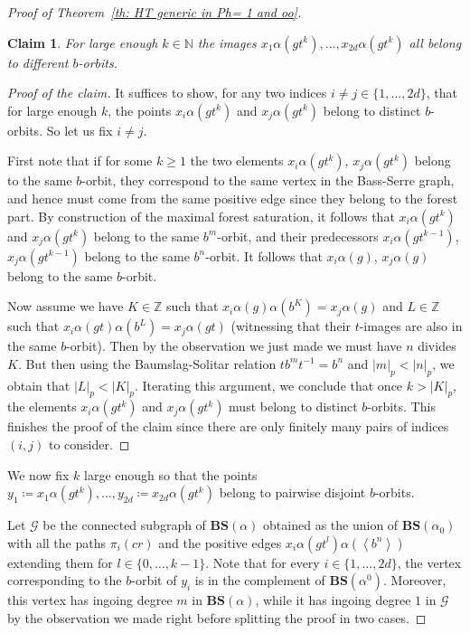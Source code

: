 \documentclass[12pt]{article}
\numberwithin{equation}{section}
\newtheorem{claim}[equation]{Claim}
\theoremstyle{definition}
\newenvironment{cproof}{\begin{proof}[Proof of the
        claim]\renewcommand*{\qedsymbol}{\(\square_\text{claim}\)}}{\end{proof}}
\newcommand{\N}{\mathbb{N}}
\newcommand{\Z}{\mathbb{Z}}
\newcommand{\inv}{^{-1}}
\newcommand{\la}{\left\langle}
\newcommand{\ra}{\right\rangle}
\newcommand{\abs}[1]{\left\lvert #1\right\rvert}
\newcommand\BSe{\mathbf{BS}}
\begin{document}
\begin{proof}[Proof of Theorem~\ref{th: HT generic in Ph= 1 and oo}]
	
	\begin{claim} 
	For large enough \(k\in\N\) the images 
	$x_1\alpha(gt^k),\dots,x_{2d}\alpha(gt^k)$ all belong to different \( b \)-orbits.
	\end{claim}
	\begin{cproof}
	It suffices to show, for any two indices \(i\neq j\in\{1,\dots,2d\}\),
	that for large enough 
	\(k\), the points \(x_i\alpha(gt^k)\) and \(x_j\alpha(gt^k)\) belong to distinct \(b\)-orbits.
	So let us fix $i\neq j$.
	


	
	
	First note that 
	if for some \(k\geq 1\) the two elements \(x_i\alpha(gt^k)\), \(x_j\alpha(gt^k)\) 
	belong to the same \(b\)-orbit, they correspond
	 to the same vertex in the Bass-Serre graph, 
	 and hence must come 
	 from the same positive edge since they belong to the
	 forest part. 
	 By construction of the maximal forest saturation,
	it follows that \(x_i\alpha(gt^k)\) and \(x_j\alpha(gt^k)\)   belong to the same \(b^m\)-orbit, and their predecessors
	\(x_i\alpha(gt^{k-1})\), \(x_j\alpha(gt^{k-1})\) belong to the same \(b^n\)-orbit.
	It follows that \(x_i\alpha(g)\), \(x_j\alpha(g)\) belong to the same \(b\)-orbit.
	

	Now assume we have $K\in\Z$ such that $x_i\alpha(g)\alpha(b^K)=x_j\alpha(g)$ 
	and \(L\in\Z\) such that $x_i\alpha(gt)\alpha(b^L)=x_j\alpha(gt)$ 
	(witnessing that their \( t \)-images are also in the same \( b \)-orbit).
	Then by the observation we just made we must have \(n\) divides \(K\).
	But then using the Baumslag-Solitar relation \(tb^mt\inv =b^n\) and \(\abs{m}_p<\abs{n}_p\), 
	we obtain that
    $\abs{L}_p<\abs{K}_p$. Iterating this argument, we conclude that once \(k>\abs{K}_p\), 
	the elements \(x_i\alpha(gt^k)\) and \(x_j\alpha(gt^k)\) must belong to distinct \(b\)-orbits. 
	This finishes the proof of the claim since there are only finitely many pairs of indices \((i,j)\) to consider.
	\end{cproof}
    
    
    We now fix \(k\) large enough so that the points
    $y_1 \coloneqq x_1\alpha(gt^k),\dots, y_{2d} \coloneqq x_{2d}\alpha(gt^k)$ belong to pairwise disjoint \( b \)-orbits. 
	

	Let \(\mathcal G\) be the connected subgraph of \(\BSe(\alpha)\)
	obtained as the union of \(\BSe(\alpha_0)\) with all the paths 
	\(\pi_i(cr)\)  and the positive edges \(x_i\alpha(gt^l)\alpha(\la b^n\ra)\) 
	extending them for 
	\(l\in\{0,\dots,k-1\}\). 
	Note that 
	for every \(i\in\{1,\dots,2d\}\), the vertex corresponding to the \( b \)-orbit 
	of $y_i$ 
	is in the complement of 
	$\BSe(\alpha^0)$. Moreover, this vertex has
	ingoing degree $m$ in \( \BSe(\alpha) \), 
    while it has ingoing degree $1$ in $\mathcal G$
	by the observation we made right before 
	splitting the proof in two cases.
	

\end{proof}
\end{document}
